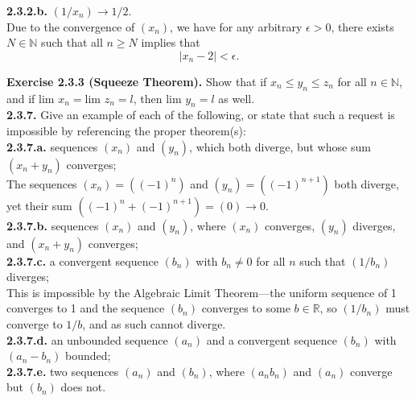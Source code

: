 \documentclass[12pt,letterpaper]{article}
\begin{document}
\textbf{2.3.2.b.} \((1/x_{n}) \to 1/2\). \\

Due to the convergence of \((x_{n})\), we have for any arbitrary \(\epsilon > 0\), there exists \(N \in \mathbb{N}\) such that all \(n \geq N\) implies that \[|x_{n} - 2| < \epsilon.\]

\textbf{Exercise 2.3.3 (Squeeze Theorem).} Show that if \(x_{n} \leq y_{n} \leq z_{n} \) for all \(n \in \mathbb{N}\), and if \(\text{lim } x_{n} = \text{lim }z_{n} = l\), then \(\text{lim } y_{n} = l\) as well. \\



\textbf{2.3.7.} Give an example of each of the following, or state that such a request is impossible by referencing the proper theorem(s): \\

\textbf{2.3.7.a.} sequences \((x_{n})\) and \((y_{n})\), which both diverge, but whose sum \((x_{n} + y_{n})\) converges; \\

The sequences \((x_{n}) = ((-1)^{n})\) and \((y_{n}) = ((-1)^{n+1})\) both diverge, yet their sum \(((-1)^{n} + (-1)^{n+1}) = (0) \to 0\). \\

\textbf{2.3.7.b.} sequences \((x_{n})\) and \((y_{n})\), where \((x_{n})\) converges, \((y_{n})\) diverges, and \((x_{n} + y_{n})\) converges; \\



\textbf{2.3.7.c.} a convergent sequence \((b_{n})\) with \(b_{n} \neq 0\) for all \(n\) such that \((1/b_{n})\) diverges; \\

This is impossible by the Algebraic Limit Theorem---the uniform sequence of 1 converges to 1 and the sequence \((b_{n})\) converges to some \(b \in \mathbb{R}\), so \((1/b_{n})\) must converge to \(1/b\), and as such cannot diverge. \\

\textbf{2.3.7.d.} an unbounded sequence \((a_{n})\) and a convergent sequence \((b_{n})\) with \((a_{n} - b_{n})\) bounded; \\



\textbf{2.3.7.e.} two sequences \((a_{n})\) and \((b_{n})\), where \((a_{n}b_{n})\) and \((a_{n})\) converge but \((b_{n})\) does not. \\
\end{document}
